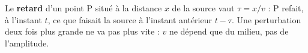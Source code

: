 \documentclass[11pt,a4paper]{article}
\begin{document}
\begin{remarque}
Le \textbf{retard} d'un point P situé à la distance $x$ de la source vaut $\tau=x/v$ :
P refait, à l'instant $t$, ce que faisait la source à l'instant antérieur $t-\tau$.
Une perturbation deux fois plus grande ne va pas plus vite : $v$ ne dépend que du milieu,
pas de l'amplitude.
\end{remarque}
\end{document}
